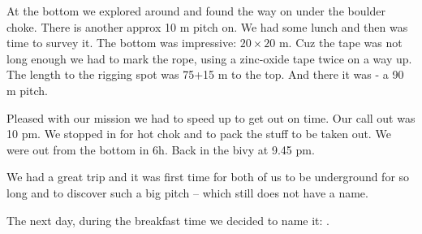 At the bottom we explored around and found the way on
under the boulder choke. There is another approx 10 m pitch on. We had
some lunch and then was time to survey it. The bottom was impressive:
\(20\times20\) m. Cuz the tape was not long enough we had to mark the
rope, using a zinc-oxide tape twice on a way up. The length to the
rigging spot was 75+15 m to the top. And there it was - a 90 m pitch.

Pleased with our mission we had to speed up to get out on time. Our call
out was 10 pm. We stopped in  for hot chok and to
pack the stuff to be taken out. We were out from the bottom in 6h. Back
in the bivy at 9.45 pm.

We had a great trip and it was first time for both of us to be
underground for so long and to discover such a big pitch -- which still
does not have a name.

The next day, during the breakfast time we decided to name it:
. 
